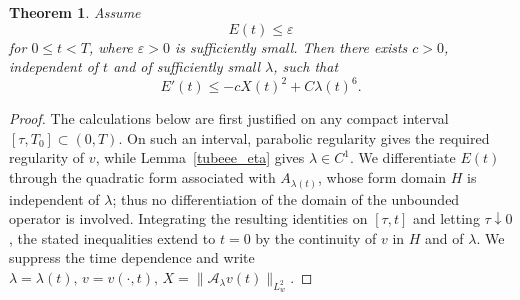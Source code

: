 \documentclass[11pt,a4paper]{article}
\numberwithin{equation}{section}
\theoremstyle{plain}
\newtheorem{theorem}{Theorem}[section]
\theoremstyle{remark}
\begin{document}
\begin{theorem}\label{errordecaythrm}
Assume
$$
E(t)\leq\varepsilon
$$
for $0\leq t<T$, where $\varepsilon>0$ is sufficiently small. Then there exists $c>0$, independent of $t$ and of sufficiently small $\lambda$, such that
\begin{equation}\label{energydiss}
E'(t)\leq-cX(t)^2+C\lambda(t)^6.
\end{equation}
\end{theorem}
\begin{proof}
The calculations below are first justified on any compact interval
$[\tau,T_0]\subset(0,T)$. On such an interval, parabolic regularity gives the
required regularity of $v$, while Lemma~\ref{tubeee_eta} gives
$\lambda\in C^1$. We differentiate $E(t)$ through the quadratic form associated
with $A_{\lambda(t)}$, whose form domain $H$ is independent of $\lambda$; thus
no differentiation of the domain of the unbounded operator is involved.
Integrating the resulting identities on $[\tau,t]$ and letting $\tau\downarrow0$,
the stated inequalities extend to $t=0$ by the continuity of $v$ in $H$ and of
$\lambda$.
We suppress the time dependence and write $\lambda=\lambda(t),
\,
v=v(\cdot,t),
\,
X=\|\mathcal A_\lambda v(t)\|_{L_w^2}$.


\end{proof}
\end{document}
